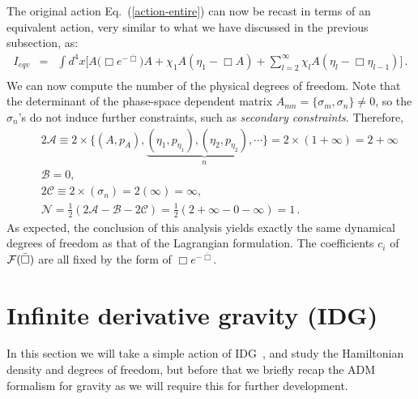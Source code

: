 \documentclass[a4paper,12pt]{article}
\newcommand{\bbox}{\bar{\Box}}
\newcommand{\sa}{\sigma}
\newcommand{\+}{^{\dagger}}
\newcommand{\2}{\frac{1}{2}}
\newcommand{\3}{\frac{1}{3}}
\newcommand{\4}{\frac{1}{4}}
\newcommand{\6}{\frac{1}{6}}
\newcommand{\8}{\frac{1}{8}}
\begin{document}
The original action Eq.~(\ref{action-entire}) can now be recast in terms of an equivalent action, very similar to what we have discussed 
in the previous subsection, as:
\begin{eqnarray}
I_{eqv}&=&\int d^{4} x\bigg[A\big(\Box e^{-\bbox}\big)A+\chi_{1}A(\eta_{1}-\Box A) +\sum
^{\infty}_{l=2}\chi_lA(\eta_l-\Box \eta_{l-1})\bigg]\,.\nonumber\\
\end{eqnarray}
We can  now compute the number of the physical degrees of freedom. Note that the determinant of the phase-space dependent matrix 
$A_{mn}=\{\sa_{m},\sa_{n} \}\neq 0$, so the $\sa_n$'s do not induce further constraints, such as {\it secondary constraints}. Therefore,
\begin{eqnarray}\label{dog}
&&2\mathcal{A}\equiv2\times\bigg\{(A,p_A),\underbrace{(\eta_1,p_{\eta_1}),(\eta_2,p_{\eta_2}),\cdots}_{n}\bigg\}
=2\times(1+\infty)=2+\infty\nonumber\\
&&\mathcal{B}=0,\nonumber\\
&&2\mathcal{C}\equiv2\times(\sigma
_{n})=2(\infty)=\infty,\nonumber\\
&&\mathcal{N}=\frac{1}{2}(2\mathcal{A}-\mathcal{B}-2\mathcal{C})=\frac{1}{2}(2+\infty-0-\infty)=1\,.
\end{eqnarray}
As expected, the conclusion of this analysis yields exactly the same dynamical degrees of freedom as that of the Lagrangian formulation. 
The coefficients  $c_i$ of ${\cal F}(\bbox)$ are all fixed by the form of $\Box e^{-\bbox}$.



\section{Infinite derivative gravity (IDG)}
\label{sec:3+1}

In this section we will take a simple action of IDG~\cite{Biswas:2005qr}, and study the Hamiltonian density and degrees of freedom, but before that we 
briefly recap the ADM formalism for gravity as we will require this for further development.
\end{document}
